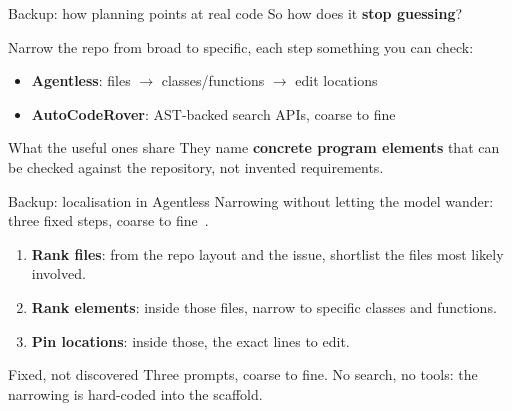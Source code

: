 \documentclass[
  aspectratio=169,
  font=times,
  sectionpage=true,
]{tumbeamer}
\begin{document}
\begin{frame}[noframenumbering]{Backup: how planning points at real code}
  \label{fr:localisation}
  {\large So how does it \textbf{stop guessing}?}

  \medskip
  Narrow the repo from broad to specific, each step something you can check:

  \bigskip
  \begin{itemize}
    \item \textbf{Agentless}: files $\rightarrow$ classes/functions
      $\rightarrow$ edit locations~\cite{xia2024agentless}
      \medskip
    \item \textbf{AutoCodeRover}: AST-backed search APIs, coarse to
      fine~\cite{zhang2024autocoderover}
  \end{itemize}

  \bigskip
  \begin{block}{What the useful ones share}
    They name \textbf{concrete program elements} that can be checked against the
    repository, not invented requirements.
  \end{block}
\end{frame}

\begin{frame}[noframenumbering]{Backup: localisation in Agentless}
  {\small Narrowing without letting the model wander: three fixed steps, coarse
  to fine~\cite{xia2024agentless}.}

  \bigskip
  \begin{enumerate}
    \item \textbf{Rank files}: from the repo layout and the issue, shortlist the
      files most likely involved.
      \medskip
    \item \textbf{Rank elements}: inside those files, narrow to specific classes
      and functions.
      \medskip
    \item \textbf{Pin locations}: inside those, the exact lines to edit.
  \end{enumerate}

  \bigskip
  \begin{block}{Fixed, not discovered}
    Three prompts, coarse to fine. No search, no tools: the narrowing is
    hard-coded into the scaffold.
  \end{block}
\end{frame}
\end{document}
